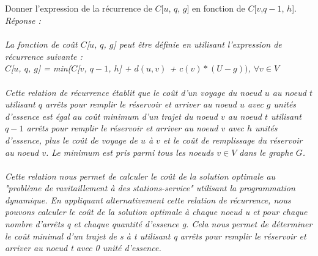 \documentclass[a4paper,11pt]{article}
\begin{document}
        \subsection{}\label{subsec:Q4}
        Donner l’expression de la récurrence de $C$[$u$, $q$, $g$] en fonction de $C$[$v$,$q-1$, $h$].\\\textit{Réponse : \\\\
            			La fonction de coût $C$[$u$, $q$, $g$] peut être définie en utilisant l'expression de récurrence suivante :\\
$C$[$u$, $q$, $g$] = min($C$[$v$, $q - 1$, $h$] + $d(u, v)$ + $c(v) * (U - g))$, $\forall v \in V$
\\\\
Cette relation de récurrence établit que le coût d'un voyage du noeud $u$ au noeud $t$ utilisant $q$ arrêts pour remplir le réservoir et arriver au noeud $u$ avec $g$ unités d'essence est égal au coût minimum d'un trajet du noeud $v$ au noeud $t$ utilisant $q - 1$ arrêts pour remplir le réservoir et arriver au noeud $v$ avec $h$ unités d'essence, plus le coût de voyage de $u$ à $v$ et le coût de remplissage du réservoir au noeud $v$. Le minimum est pris parmi tous les noeuds $v \in V$ dans le graphe $G$.
\\\\
Cette relation nous permet de calculer le coût de la solution optimale au "problème de ravitaillement à des stations-service" utilisant la programmation dynamique. En appliquant alternativement cette relation de récurrence, nous pouvons calculer le coût de la solution optimale à chaque noeud u et pour chaque nombre d'arrêts q et chaque quantité d'essence g. Cela nous permet de déterminer le coût minimal d'un trajet de s à t utilisant q arrêts pour remplir le réservoir et arriver au noeud t avec 0 unité d'essence. }
   
\end{document}
